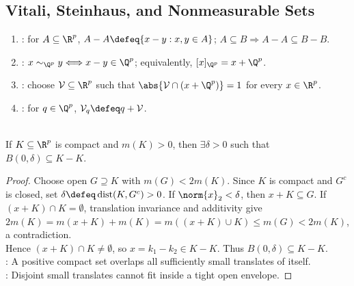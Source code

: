 \subsection{Vitali, Steinhaus, and Nonmeasurable Sets}

\begin{definition} \label{def:difference-set-and-vitali-selector} 
\begin{enumerate}[label=(\roman*)]
\setlength{\itemsep}{0pt}
\item {}: for $A\subseteq\R^p$, $A-A\defeq\{x-y:x,y\in A\}$; $A\subseteq B\Longrightarrow A-A\subseteq B-B$.
\item {}: $x\sim_{\Q^p}y\Longleftrightarrow x-y\in\Q^p$; equivalently, $[x]_{\Q^p}=x+\Q^p$.
\item {}: choose $\mathcal{V}\subseteq\R^p$ such that $\abs{\mathcal{V}\cap(x+\Q^p)}=1$ for every $x\in\R^p$.
\item {}: for $q\in\Q^p$, $\mathcal{V}_q\defeq q+\mathcal{V}$.
\end{enumerate}
\end{definition}

\begin{lemma} \label{lem:steinhaus-compact-positive-measure} \\
If $K\subseteq\R^p$ is compact and $m(K)>0$, then $\exists\delta>0$ such that $B(0,\delta)\subseteq K-K$.
\begin{proof}
Choose open $G\supseteq K$ with $m(G)<2m(K)$. Since $K$ is compact and $G^c$ is closed, set $\delta\defeq\operatorname{dist}(K,G^c)>0$. If $\norm{x}_2<\delta$, then $x+K\subseteq G$. If $(x+K)\cap K=\emptyset$, translation invariance and additivity give\\
$2m(K)=m(x+K)+m(K)=m((x+K)\cup K)\leq m(G)<2m(K)$, a contradiction.\\
Hence $(x+K)\cap K\neq\emptyset$, so $x=k_1-k_2\in K-K$. Thus $B(0,\delta)\subseteq K-K$.\\
: A positive compact set overlaps all sufficiently small translates of itself.\\
: Disjoint small translates cannot fit inside a tight open envelope.
\end{proof}
\end{lemma}

